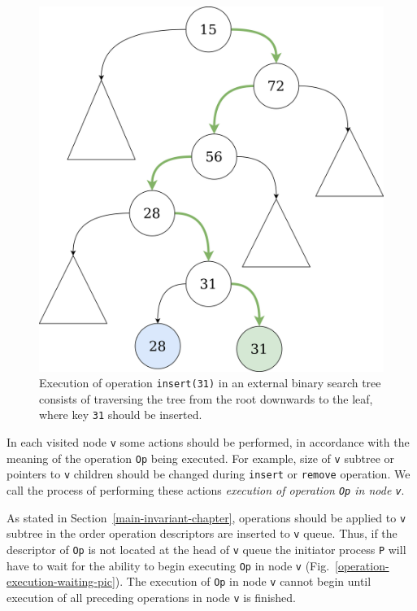 \documentclass[times, dvipsnames,%
               languages={russian,english} %
              ]{itmo-student-thesis}
\begin{document}
\begin{figure}[H]
  \centering
  \caption{Execution of operation \texttt{insert(31)} in an external binary search tree consists of traversing the tree from the root downwards to the leaf, where key \texttt{31} should be inserted.}
  \label{traversal-to-node-pic}
  \includegraphics[width=\linewidth]{pics/traversal-to-node.png}
\end{figure}

\begin{definition}
In each visited node \texttt{v} some actions should be performed, in accordance with the meaning of the operation \texttt{Op} being executed. For example, size of \texttt{v} subtree or pointers to \texttt{v} children should be changed during \texttt{insert} or \texttt{remove} operation. We call the process of performing these actions \emph{execution of operation \texttt{Op} in node \texttt{v}}.
\end{definition}

As stated in Section~\ref{main-invariant-chapter}, operations should be applied to \texttt{v} subtree in the order operation descriptors are inserted to \texttt{v} queue. Thus, if the descriptor of \texttt{Op} is not located at the head of \texttt{v} queue the initiator process \texttt{P} will have to wait for the ability to begin executing \texttt{Op} in node \texttt{v} (Fig.~\ref{operation-execution-waiting-pic}). The execution of \texttt{Op} in node \texttt{v} cannot begin until execution of all preceding operations in node \texttt{v} is finished.
\end{document}
